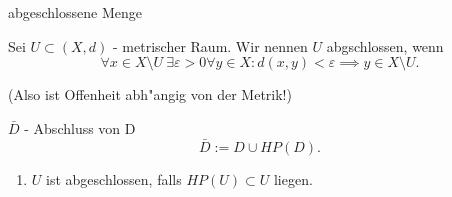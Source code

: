\documentclass[class=article, crop=false]{standalone}
\begin{document}
\begin{zettel}{abgeschlossene Menge}
\begin{flashcard}
\begin{definition}[abgeschlossen]
    Sei $U \subset (X,d)$ - metrischer Raum. Wir nennen $U$ abgschlossen, wenn
\[
    \forall x \in  X \setminus U \  \exists \varepsilon > 0 \forall y \in X : d(x,y) < \varepsilon \implies y \in  X \setminus U
.\]

(Also ist Offenheit abh"angig von der Metrik!)
\end{definition}
\end{flashcard}

\begin{flashcard}
    \begin{definition}[Abschluss]
    $ \bar{D} $ - Abschluss von D
    \[
        \bar{D} := D \cup HP(D)
    .\]
\end{definition}
\end{flashcard}

\begin{enumerate}
    \item $U$ ist abgeschlossen, falls $HP(U) \subset U$ liegen.
\end{enumerate}

\end{zettel}
\end{document}
